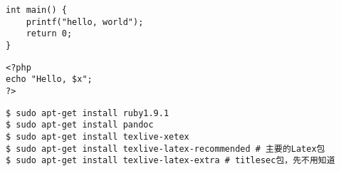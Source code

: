\documentclass{article}
\begin{document}
\begin{verbatim}
int main() {
	printf("hello, world");
	return 0;
}
\end{verbatim}

\begin{verbatim}
<?php
echo "Hello, $x";
?>
\end{verbatim}

\begin{verbatim}
$ sudo apt-get install ruby1.9.1
$ sudo apt-get install pandoc
$ sudo apt-get install texlive-xetex
$ sudo apt-get install texlive-latex-recommended # 主要的Latex包
$ sudo apt-get install texlive-latex-extra # titlesec包，先不用知道
\end{verbatim}	
\end{document}

